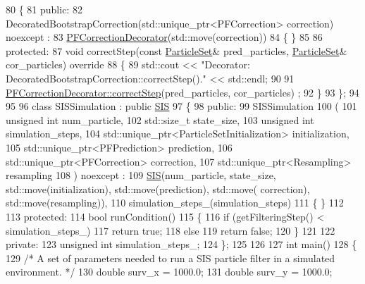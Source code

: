 \begin{DoxyCodeInclude}
80 \{
81 \textcolor{keyword}{public}:
82     DecoratedBootstrapCorrection(std::unique\_ptr<PFCorrection> correction) noexcept :
83         \mbox{\hyperlink{classbfl_1_1PFCorrectionDecorator}{PFCorrectionDecorator}}(std::move(correction))
84     \{ \}
85 
86 \textcolor{keyword}{protected}:
87     \textcolor{keywordtype}{void} correctStep(\textcolor{keyword}{const} \mbox{\hyperlink{classbfl_1_1ParticleSet}{ParticleSet}}& pred\_particles, \mbox{\hyperlink{classbfl_1_1ParticleSet}{ParticleSet}}& cor\_particles)\textcolor{keyword}{
       override}
88 \textcolor{keyword}{    }\{
89         std::cout << \textcolor{stringliteral}{"Decorator: DecoratedBootstrapCorrection::correctStep()."} << std::endl;
90 
91         \mbox{\hyperlink{classbfl_1_1PFCorrectionDecorator_a83bb9ac8ba168f99f211973ae634391a}{PFCorrectionDecorator::correctStep}}(pred\_particles, cor\_particles)
      ;
92     \}
93 \};
94 
95 
96 \textcolor{keyword}{class }SISSimulation : \textcolor{keyword}{public} \mbox{\hyperlink{classbfl_1_1SIS}{SIS}}
97 \{
98 \textcolor{keyword}{public}:
99     SISSimulation
100     (
101         \textcolor{keywordtype}{unsigned} \textcolor{keywordtype}{int} num\_particle,
102         std::size\_t state\_size,
103         \textcolor{keywordtype}{unsigned} \textcolor{keywordtype}{int} simulation\_steps,
104         std::unique\_ptr<ParticleSetInitialization> initialization,
105         std::unique\_ptr<PFPrediction> prediction,
106         std::unique\_ptr<PFCorrection> correction,
107         std::unique\_ptr<Resampling> resampling
108     ) noexcept :
109         \mbox{\hyperlink{classbfl_1_1SIS}{SIS}}(num\_particle, state\_size, std::move(initialization), std::move(prediction), std::move(
      correction), std::move(resampling)),
110         simulation\_steps\_(simulation\_steps)
111     \{ \}
112 
113 \textcolor{keyword}{protected}:
114     \textcolor{keywordtype}{bool} runCondition()
115     \{
116         \textcolor{keywordflow}{if} (getFilteringStep() < simulation\_steps\_)
117             \textcolor{keywordflow}{return} \textcolor{keyword}{true};
118         \textcolor{keywordflow}{else}
119             \textcolor{keywordflow}{return} \textcolor{keyword}{false};
120     \}
121 
122 \textcolor{keyword}{private}:
123     \textcolor{keywordtype}{unsigned} \textcolor{keywordtype}{int} simulation\_steps\_;
124 \};
125 
126 
127 \textcolor{keywordtype}{int} main()
128 \{
129     \textcolor{comment}{/* A set of parameters needed to run a SIS particle filter in a simulated environment. */}
130     \textcolor{keywordtype}{double} surv\_x = 1000.0;
131     \textcolor{keywordtype}{double} surv\_y = 1000.0;

\end{DoxyCodeInclude}
